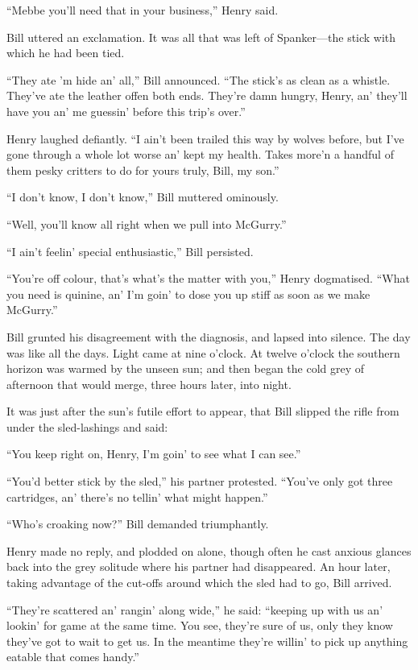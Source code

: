 “Mebbe you’ll need that in your business,” Henry said.

Bill uttered an exclamation. It was all that was left of Spanker—the
stick with which he had been tied.

“They ate ’m hide an’ all,” Bill announced. “The stick’s as clean as a
whistle. They’ve ate the leather offen both ends. They’re damn hungry,
Henry, an’ they’ll have you an’ me guessin’ before this trip’s over.”

Henry laughed defiantly. “I ain’t been trailed this way by wolves
before, but I’ve gone through a whole lot worse an’ kept my health.
Takes more’n a handful of them pesky critters to do for yours truly,
Bill, my son.”

“I don’t know, I don’t know,” Bill muttered ominously.

“Well, you’ll know all right when we pull into McGurry.”

“I ain’t feelin’ special enthusiastic,” Bill persisted.

“You’re off colour, that’s what’s the matter with you,” Henry
dogmatised. “What you need is quinine, an’ I’m goin’ to dose you up
stiff as soon as we make McGurry.”

Bill grunted his disagreement with the diagnosis, and lapsed into
silence. The day was like all the days. Light came at nine o’clock. At
twelve o’clock the southern horizon was warmed by the unseen sun; and
then began the cold grey of afternoon that would merge, three hours
later, into night.

It was just after the sun’s futile effort to appear, that Bill slipped
the rifle from under the sled-lashings and said:

“You keep right on, Henry, I’m goin’ to see what I can see.”

“You’d better stick by the sled,” his partner protested. “You’ve only
got three cartridges, an’ there’s no tellin’ what might happen.”

“Who’s croaking now?” Bill demanded triumphantly.

Henry made no reply, and plodded on alone, though often he cast anxious
glances back into the grey solitude where his partner had disappeared.
An hour later, taking advantage of the cut-offs around which the sled
had to go, Bill arrived.

“They’re scattered an’ rangin’ along wide,” he said: “keeping up with
us an’ lookin’ for game at the same time. You see, they’re sure of us,
only they know they’ve got to wait to get us. In the meantime they’re
willin’ to pick up anything eatable that comes handy.”

